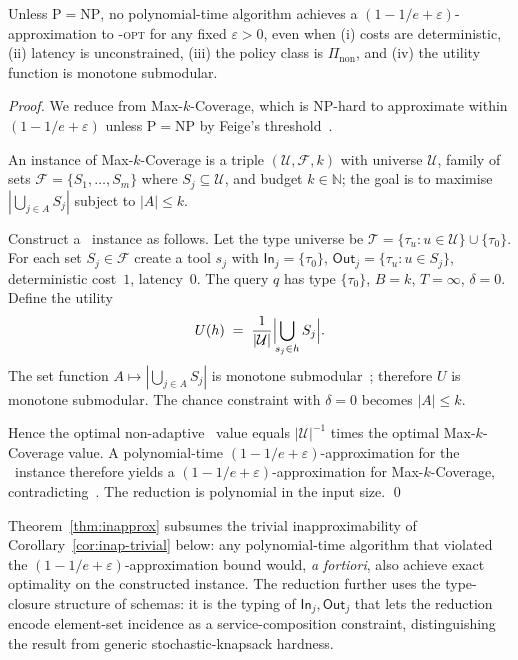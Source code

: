 \begin{theorem}
\label{thm:inapprox}
Unless $\mathrm{P} = \mathrm{NP}$, no polynomial-time algorithm
achieves a $(1 - 1/e + \varepsilon)$-approximation to \CBSLAO-\textsc{opt}
for any fixed $\varepsilon > 0$, even when
(i) costs are deterministic,
(ii) latency is unconstrained,
(iii) the policy class is $\Pi_{\mathrm{non}}$, and
(iv) the utility function is monotone submodular.
\end{theorem}

\begin{proof}
We reduce from Max-$k$-Coverage, which is NP-hard to approximate within
$(1 - 1/e + \varepsilon)$ unless $\mathrm{P} = \mathrm{NP}$ by
Feige's threshold~\cite{feige1998threshold}.

An instance of Max-$k$-Coverage is a triple
$(\mathcal{U}, \mathcal{F}, k)$ with universe $\mathcal{U}$, family of
sets $\mathcal{F} = \{S_1, \dots, S_m\}$ where $S_j \subseteq \mathcal{U}$,
and budget $k \in \mathbb{N}$; the goal is to maximise
$|\bigcup_{j \in A} S_j|$ subject to $|A| \le k$.

Construct a \CBSLAO~instance as follows. Let the type universe be
$\mathcal{T} = \{\tau_u : u \in \mathcal{U}\} \cup \{\tau_0\}$. For each
set $S_j \in \mathcal{F}$ create a tool $s_j$ with
$\mathsf{In}_j = \{\tau_0\}$, $\mathsf{Out}_j = \{\tau_u : u \in S_j\}$,
deterministic cost~$1$, latency~$0$. The query $q$ has type
$\{\tau_0\}$, $B = k$, $T = \infty$, $\delta = 0$. Define the utility
\[
  U(h) \;=\; \frac{1}{|\mathcal{U}|}
  \Bigl|\!\bigcup_{s_j \in h} S_j\Bigr|.
\]
The set function $A \mapsto |\bigcup_{j \in A} S_j|$ is monotone
submodular~\cite{nemhauser1978best}; therefore $U$ is monotone
submodular. The chance constraint with $\delta = 0$ becomes
$|A| \le k$.

Hence the optimal non-adaptive \CBSLAO~value equals
$|\mathcal{U}|^{-1}$ times the optimal Max-$k$-Coverage value. A
polynomial-time $(1 - 1/e + \varepsilon)$-approximation for the
\CBSLAO~instance therefore yields a
$(1 - 1/e + \varepsilon)$-approximation for Max-$k$-Coverage,
contradicting~\cite{feige1998threshold}. The reduction is polynomial
in the input size.
\qed
\end{proof}

\begin{remark}
\label{rem:inapprox-tightness}
Theorem~\ref{thm:inapprox} subsumes the trivial inapproximability of
Corollary~\ref{cor:inap-trivial} below: any polynomial-time algorithm
that violated the $(1 - 1/e + \varepsilon)$-approximation bound would,
\emph{a fortiori}, also achieve exact optimality on the constructed
instance. The reduction further uses the type-closure structure of
schemas: it is the typing of $\mathsf{In}_j, \mathsf{Out}_j$ that lets
the reduction encode element-set incidence as a service-composition
constraint, distinguishing the result from generic
stochastic-knapsack hardness.
\end{remark}


